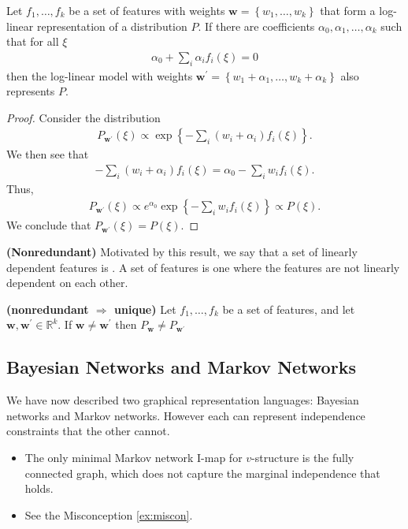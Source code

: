 \documentclass{article}
\newcommand{\bfs}[1]{\textbf{({#1}) }}
\begin{document}
\begin{lema}
Let $f_{1}, \ldots, f_{k}$ be a set of features with weights $\boldsymbol{w}=\left\{w_{1}, \ldots, w_{k}\right\}$ that form a log-linear representation of a distribution $P$. If there are coefficients $\alpha_{0}, \alpha_{1}, \ldots, \alpha_{k}$ such that for all $\xi$
\begin{align*}
\alpha_{0}+\sum_{i} \alpha_{i} f_{i}(\xi)=0
\end{align*}
then the log-linear model with weights $\boldsymbol{w}^{\prime}=\left\{w_{1}+\alpha_{1}, \ldots, w_{k}+\alpha_{k}\right\}$ also represents $P$.
\end{lema}
\begin{proof}
Consider the distribution
\begin{align*}
P_{\boldsymbol{w}^{\prime}}(\xi) \propto \exp \left\{-\sum_{i}\left(w_{i}+\alpha_{i}\right) f_{i}(\xi)\right\} .
\end{align*}
We then see that
\begin{align*}
-\sum_{i}\left(w_{i}+\alpha_{i}\right) f_{i}(\xi)=\alpha_{0}-\sum_{i} w_{i} f_{i}(\xi) .
\end{align*}
Thus,
\begin{align*}
P_{\boldsymbol{w}^{\prime}}(\xi) \propto e^{\alpha_{0}} \exp \left\{-\sum_{i} w_{i} f_{i}(\xi)\right\} \propto P(\xi) .
\end{align*}
We conclude that $P_{\boldsymbol{w}^{\prime}}(\xi)=P(\xi)$.
\end{proof} 
\begin{defa}\bfs{Nonredundant}
Motivated by this result, we say that a set of linearly dependent features is . A  set of features is one where the features are not linearly dependent on each other.
\end{defa}
\begin{lema}\bfs{nonredundant $\Rightarrow$ unique}
Let $f_{1}, \ldots, f_{k}$ be a set of  features, and let $\boldsymbol{w}, \boldsymbol{w}^{\prime} \in \mathbb{R}^{k} .$ If $\boldsymbol{w} \neq \boldsymbol{w}^{\prime}$ then $P_{\boldsymbol{w}} \neq P_{\boldsymbol{w}^{\prime}}$
\end{lema}
\subsection{Bayesian Networks and Markov Networks}
We have now described two graphical representation languages: Bayesian networks and Markov networks. However each  can represent independence constraints that the other cannot.
\begin{itemize}
    \item {} The only minimal Markov network I-map for $v$-structure is the fully connected graph, which does not capture the marginal independence that holds. 
    \item {} See the Misconception \cref{ex:miscon}.
\end{itemize}
\end{document}
